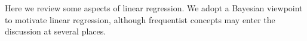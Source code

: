 
Here we review some aspects of linear regression. 
We adopt a Bayesian viewpoint to motivate linear regression, although frequentist concepts may enter the discussion at several places.  
